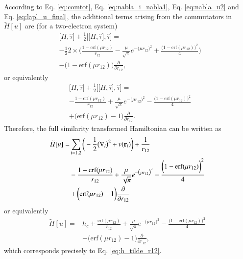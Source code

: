 \documentclass[aip,jcp,reprint,noshowkeys,superscriptaddress]{revtex4-1}
\newcommand{\deriv}[3]{\frac{\partial^{#3} #1}{\partial {#2}^{#3}}}
\newcommand{\br}[0]{{\bf {r}}}
\begin{document}
According to Eq. \eqref{eq:comtot}, Eq. \eqref{eq:nabla_i_nabla1}, Eq. \eqref{eq:nabla_u2} and Eq. \eqref{eq:lapl_u_final}, the additional terms arising from the commutators in $\tilde{H}[u]$ are (for a two-electron system) 
\begin{equation}
 \begin{aligned}
 \label{eq:comtot2}
 & \big[ H,\hat{\tau} \big] + \frac{1}{2} \bigg[ \big[H,\hat{\tau}\big],\hat{\tau}\bigg] =  \\
 & -\frac{1}{2} 2 \times \bigg( \frac{1 - \text{erf}(\mu r_{12})}{r_{12}} - \frac{\mu}{\sqrt{\pi}} e^{-\big(\mu r_{12} \big)^2} + \frac{\bigg(1 - \text{erf}(\mu r_{12}) \bigg)^2}{4}  \bigg) \\
   &- \bigg( 1 - \text{erf}(\mu r_{12})\bigg) \deriv{}{r_{12}}{},
 \end{aligned}
\end{equation}
or equivalently
\begin{equation}
 \begin{aligned}
 \label{eq:comtot2}
 & \big[ H,\hat{\tau} \big] + \frac{1}{2} \bigg[ \big[H,\hat{\tau}\big],\hat{\tau}\bigg] =  \\
 & -\frac{1 - \text{erf}(\mu r_{12})}{r_{12}} + \frac{\mu}{\sqrt{\pi}} e^{-\big(\mu r_{12} \big)^2} - \frac{\bigg(1 - \text{erf}(\mu r_{12}) \bigg)^2}{4} \\
   & + \bigg( \text{erf}(\mu r_{12}) - 1\bigg) \deriv{}{r_{12}}{}.
 \end{aligned}
\end{equation}
Therefore, the full similarity transformed Hamiltonian can be written as
\begin{equation}
  \begin{aligned}
   \tilde{H}[u] = & \sum_{i = 1,2} \bigg( -\frac{1}{2} \big(\nabla_i\big)^2 + v(\br{}_i)  \bigg) + \frac{1}{r_{12}} \\
&   -\frac{1 - \text{erf}(\mu r_{12})}{r_{12}} + \frac{\mu}{\sqrt{\pi}} e^{-\big(\mu r_{12} \big)^2} - \frac{\bigg(1 -     \text{erf}(\mu r_{12}) \bigg)^2}{4} \\
& + \bigg( \text{erf}(\mu r_{12}) - 1\bigg) \deriv{}{r_{12}}{}
  \end{aligned}
\end{equation}
or equivalently 
\begin{equation}
  \begin{aligned}
   \tilde{H}[u] = & h_c + \frac{\text{erf}(\mu r_{12})}{r_{12}} + \frac{\mu}{\sqrt{\pi}} e^{-\big(\mu r_{12} \big)^2} - \frac{\bigg(1 -     \text{erf}(\mu r_{12}) \bigg)^2}{4} \\
& + \bigg( \text{erf}(\mu r_{12}) - 1\bigg) \deriv{}{r_{12}}{},
  \end{aligned}
\end{equation}
which corresponds precisely to Eq. \eqref{eq:h_tilde_r12}. 
\end{document}
